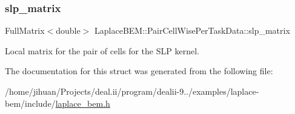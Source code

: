 \subsubsection{\texorpdfstring{slp\+\_\+matrix}{slp\_matrix}}
{\footnotesize\ttfamily Full\+Matrix$<$double$>$ Laplace\+B\+E\+M\+::\+Pair\+Cell\+Wise\+Per\+Task\+Data\+::slp\+\_\+matrix}

Local matrix for the pair of cells for the S\+LP kernel. 

The documentation for this struct was generated from the following file\+:\begin{DoxyCompactItemize}
\item 
/home/jihuan/\+Projects/deal.\+ii/program/dealii-\/9../examples/laplace-\/bem/include/\hyperlink{laplace__bem_8h}{laplace\+\_\+bem.\+h}\end{DoxyCompactItemize}
